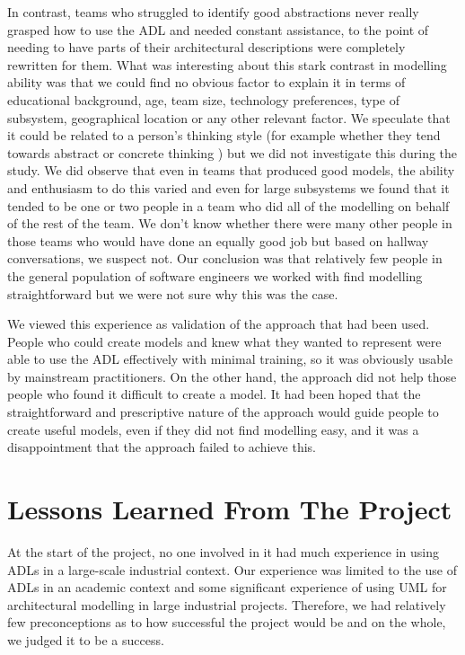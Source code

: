   In contrast, teams who struggled to identify good abstractions never really grasped how to use the ADL and needed constant assistance, to the point of needing to have parts of their architectural descriptions were completely rewritten for them.   What was interesting about this stark contrast in modelling ability was that we could find no obvious factor to explain it in terms of educational background, age, team size, technology preferences, type of subsystem, geographical location or any other relevant factor.  We speculate that it could be related to a person's thinking style (for example whether they tend towards abstract or concrete thinking \cite{ylvisaker2006-concreteabstract}) but we did not investigate this during the study.  We did observe that even in teams that produced good models, the ability and enthusiasm to do this varied and even for large subsystems we found that it tended to be one or two people in a team who did all of the modelling on behalf of the rest of the team.  We don't know whether there were many other people in those teams who would have done an equally good job but based on hallway conversations, we suspect not.  Our conclusion was that relatively few people in the general population of software engineers we worked with find modelling straightforward but we were not sure why this was the case.

  We viewed this experience as validation of the approach that had been used.  People who could create models and knew what they wanted to represent were able to use the ADL effectively with minimal training, so it was obviously usable by mainstream practitioners.  On the other hand, the approach did not help those people who found it difficult to create a model.  It had been hoped that the straightforward and prescriptive nature of the approach would guide people to create useful models, even if they did not find modelling easy, and it was a disappointment that the approach failed to achieve this.

  \section{Lessons Learned From The Project}

  At the start of the project, no one involved in it had much experience in using ADLs in a large-scale industrial context.  Our experience was limited to the use of ADLs in an academic context and some significant experience of using UML for architectural modelling in large industrial projects.  Therefore, we had relatively few preconceptions as to how successful the project would be and on the whole, we judged it to be a success.

